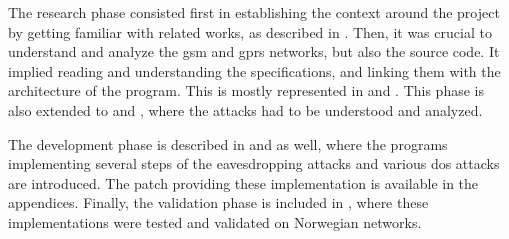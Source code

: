     The research phase consisted first in establishing the context
    around the project by getting familiar with related works, as
    described in . Then, it was crucial to
    understand and analyze the \gls{gsm} and \gls{gprs} networks, but
    also the  source code. It implied reading and
    understanding the specifications, and linking them with the
    architecture of the program. This is mostly represented in
     and
    . This phase is also
    extended to  and
    , where the attacks had to be understood and
    analyzed.

    The development phase is described in
     and  as
    well, where the programs implementing several steps of the
    eavesdropping attacks and various \gls{dos} attacks are introduced.
    The patch providing these implementation is available in the
    appendices. Finally, the validation phase is included in
    , where
    these implementations were tested and validated on Norwegian
    networks.




